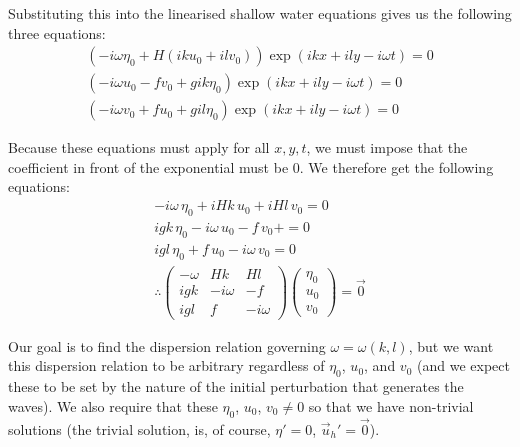 Substituting this into the linearised shallow water equations gives us the following three equations:
\begin{align*}
    \left( -i\omega\eta_0 + H (iku_0+ilv_0) \right)\exp\left( ikx+ily-i\omega t \right)=0\\
    \left( -i\omega u_0-fv_0+gik\eta_0 \right)\exp\left( ikx+ily-i\omega t \right)=0\\
    \left( -i\omega v_0+fu_0+gil\eta_0 \right)\exp\left( ikx+ily-i\omega t \right)=0
\end{align*}

Because these equations must apply for all \(x,y,t\), we must impose that the coefficient in front of the exponential must be \(0\). We therefore get the following equations:
\begin{align}
    -i\omega\,\eta_0 + iHk\,u_0+iHl\,v_0 =0
    \nonumber
    \\
    igk\,\eta_0-i\omega\, u_0-f\,v_0+ =0
    \nonumber
    \\
    igl\,\eta_0+f\,u_0-i\omega \,v_0=0
    \nonumber
    \\
    \therefore
    \left( \begin{array}{ccc}
        -\omega & Hk & Hl \\
        igk & -i\omega & -f\\
        igl & f & -i\omega
    \end{array} \right)
    \left( \begin{array}{c}
        \eta_0\\
        u_0\\
        v_0
    \end{array} \right)
    =\vec{0}
    \label{Matrix Poincare}
\end{align}

Our goal is to find the dispersion relation governing \(\omega=\omega(k,l)\), but we want this dispersion relation to be arbitrary regardless of \(\eta_0\), \(u_0\), and \(v_0\) (and we expect these to be set by the nature of the initial perturbation that generates the waves). We also require that these \(\eta_0\), \(u_0\), \(v_0\neq 0\) so that we have non-trivial solutions (the trivial solution, is, of course, \(\eta'=0\), \(\vec{u}_h'=\vec{0}\)).

